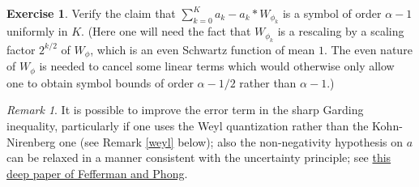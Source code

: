 \documentclass[11pt]{article}
\theoremstyle{definition}
\newtheorem{exercise}[theorem]{Exercise}
\theoremstyle{remark}
\newtheorem{remark}[theorem]{Remark}
\begin{document}
\begin{exercise}
  Verify the claim that \({\sum_{k=0}^K a_k - a_k * W_{\phi_k}}\) is a symbol of order \({\alpha-1}\) uniformly in \({K}\). (Here one will need the fact that \({W_{\phi_k}}\) is a rescaling by a scaling factor \({2^{k/2}}\) of \({W_\phi}\), which is an even Schwartz function of mean \({1}\). The even nature of \({W_\phi}\) is needed to cancel some linear terms which would otherwise only allow one to obtain symbol bounds of order \({\alpha-1/2}\) rather than \({\alpha-1}\).) 

\end{exercise}
\begin{remark}
  It is possible to improve the error term in the sharp Garding inequality, particularly if one uses the Weyl quantization rather than the Kohn-Nirenberg one (see Remark \ref{weyl} below); also the non-negativity hypothesis on \({a}\) can be relaxed in a manner consistent with the uncertainty principle; see \href{https://mathscinet.ams.org/mathscinet-getitem?mr=611747}{this deep paper of Fefferman and Phong}. 

\end{remark}
\end{document}

